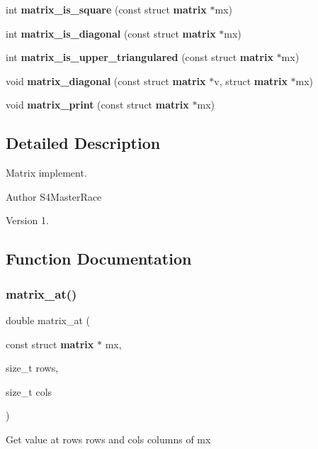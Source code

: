 \begin{DoxyCompactItemize}
\item 
int \textbf{ matrix\+\_\+is\+\_\+square} (const struct \textbf{ matrix} $\ast$mx)
\item 
int \textbf{ matrix\+\_\+is\+\_\+diagonal} (const struct \textbf{ matrix} $\ast$mx)
\item 
int \textbf{ matrix\+\_\+is\+\_\+upper\+\_\+triangulared} (const struct \textbf{ matrix} $\ast$mx)
\item 
void \textbf{ matrix\+\_\+diagonal} (const struct \textbf{ matrix} $\ast$v, struct \textbf{ matrix} $\ast$mx)
\item 
void \textbf{ matrix\+\_\+print} (const struct \textbf{ matrix} $\ast$mx)
\end{DoxyCompactItemize}


\subsection{Detailed Description}
Matrix implement. 

\begin{DoxyAuthor}{Author}
S4\+Master\+Race 
\end{DoxyAuthor}
\begin{DoxyVersion}{Version}
1. 
\end{DoxyVersion}


\subsection{Function Documentation}
\mbox{\label{matrix_8h_ace105cd24473b52d67874132e81dd55b}} 
\subsubsection{matrix\+\_\+at()}
{\footnotesize\ttfamily double matrix\+\_\+at (\begin{DoxyParamCaption}\item[{const struct \textbf{ matrix} $\ast$}]{mx,  }\item[{size\+\_\+t}]{rows,  }\item[{size\+\_\+t}]{cols }\end{DoxyParamCaption})\hspace{0.3cm}{\ttfamily [inline]}}

Get value at {\ttfamily rows} rows and {\ttfamily cols} columns of {\ttfamily mx}


